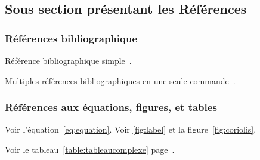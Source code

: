 \subsection{Sous section présentant les Références}

\subsubsection{Références bibliographique}

Référence bibliographique simple~\cite{Amendola2017}.

Multiples références bibliographiques en une seule commande~\cite{Petkov2005,Raman2009,Colinet2004}.


\subsubsection{Références aux équations, figures, et tables}

Voir l'équation~\eqref{eq:equation}. Voir \autoref{fig:label} et la figure~\ref{fig:coriolis}.

Voir le tableau~\ref{table:tableaucomplexe} page~\pageref{table:tableaucomplexe}.

